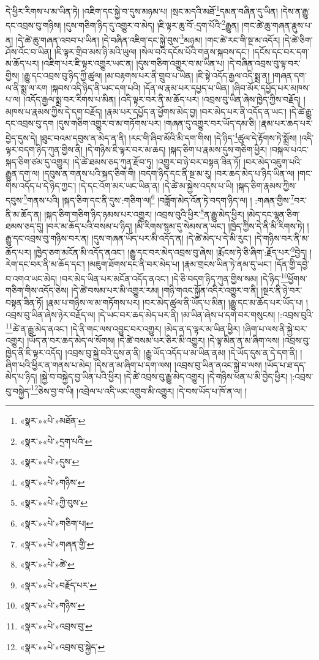 དེ་ཕྱིར་རིགས་པ་མ་ཡིན་ཏེ། །འཇིག་དང་སྐྱེ་བ་དུས་མཉམ་པ། །སྲང་མདའི་མཐོ་\footnote{«སྣར་»«པེ་»མཐོན་}དམན་བཞིན་དུ་ཡིན། །དེས་ན་རྒྱུ་དང་འབྲས་བུ་གཉིས། །དུས་གཅིག་ཉིད་དུ་འགྱུར་བ་མེད། །ཇི་ལྟར་ཆུ་བོ་:དྲག་པོའི་\footnote{«སྣར་»«པེ་»དྲག་པའི་}རྒྱུན། །གང་ཚེ་ཆུ་གཞན་རྣུས་པ་ན། །དེ་ཚེ་ཆུ་གཞན་འབབ་པ་ཡིན། །དེ་བཞིན་འཇིག་དང་སྐྱེ་བུས་\footnote{«སྣར་»«པེ་»དུས་}མཉམ། །གང་ཚེ་རང་གི་སྔ་མ་འདོར། །དེ་ཚེ་ཅིག་ཤོས་འོང་བ་ཡིན། །ཇི་ལྟར་གྲིབ་མས་ཉི་མའི་ཡུལ། །སེལ་བའི་དངོས་པོའི་གནས་སྐབས་དང་། །དངོས་དང་བར་དག་མ་ཆོད་པར། །འཇིག་པར་ཇི་ལྟར་འགྱུར་ཡང་ན། །དུས་གཅིག་འགྱུར་བ་མ་ཡིན་པ། །དེ་བཞིན་འབྲས་བུ་ལྟ་བར་གྱིས། །རྒྱུ་དང་འབྲས་བུ་ཉིད་ཀྱི་ཚུལ། །མ་བརྟགས་པར་ནི་གྲུབ་པ་ཡིན། །ཇི་སྟེ་འདོད་རྒྱལ་འདི་སྨྲ་ན། །གཞན་དག་ལ་ནི་སྨྲ་ལ་རག །སྐབས་འདི་ཉིད་ནི་ཡང་དག་པའི། །དོན་ལ་རྣམ་པར་དཔྱད་པ་ཡིན། །ཞིབ་མོར་དཔྱོད་པར་མཁས་པ་ལ། །འདོད་རྒྱལ་སྨྲ་བར་རིགས་པ་མིན། །འདི་ལྟར་བར་ནི་མ་ཆོད་པར། །འབྲས་བུ་ཡིན་ཞེས་ཁྱེད་ཀྱིས་བརྗོད། །མཁས་པ་རྣམས་ཀྱིས་དེ་དག་བརྗོད། །རྣམ་པར་དཔྱོད་ན་ཕྱོགས་མེད་བྱ། །བར་མེད་པར་ནི་འདོད་ན་ཡང་། །དེ་ཚེ་རྒྱུ་དང་འབྲས་བུ་དག །དུས་གཅིག་འགྱུར་བ་མ་གཏོགས་པར། །གཞན་དུ་འགྱུར་བར་ཡོད་དམ་ཅི། །རྣམ་པར་ཆད་པར་བྱེད་དུས་དེ། །ཐུང་བའམ་དབུས་ན་མེད་ན་ནི། །རང་གི་ཞིབ་མོའི་མི་དག་གིས། །དེ་ཉིད་\footnote{«སྣར་»«པེ་»གཉིས་}ཚུལ་དེ་རྟོགས་ཏེ་སྨྲོས། །འདི་ལྟར་བདག་ཉིད་ཀུན་གྱིས་ནི། །དེ་གཉིས་ཇི་ལྟར་བར་མ་ཆད། །སྐད་ཅིག་པ་རྣམས་དུས་གཅིག་ཕྱིར། །བསྐལ་པའང་སྐད་ཅིག་ཙམ་དུ་འགྱུར། །དེ་ཚེ་ཐམས་ཅད་ཀུན་རྫོབ་ཏུ། །འགྱུར་བ་ཉེ་བར་བསྟན་ཟིན་ཏོ། །བར་མེད་འཇུག་པའི་རྒྱུན་དག་ལ། །དབུས་ན་གནས་པའི་སྐད་ཅིག་གི། །བདག་ཉིད་དང་ནི་སྔ་མ་རུ། །བར་ཆད་མེད་པ་ཉིད་ཡིན་ལ། །གང་གིས་འདོད་པ་དེ་ཉིད་ཀྱང་། །དེ་དང་འོག་མར་ཡང་ཡིན་ན། །དེ་ཚེ་མ་སྐྱེས་འདས་པ་ཡི། །སྐད་ཅིག་རྣམས་ཀྱིས་དབུས་\footnote{«སྣར་»«པེ་»ཀྱི་བུས་}གནས་པའི། །སྐད་ཅིག་དང་ནི་དུས་:གཅིག་ལ།\footnote{«སྣར་»«པེ་»གཅིག་པ།} །བཟློག་མེད་འོན་ཏེ་བདག་ཉིད་ལ། །
:གཞན་གྱིས་\footnote{«སྣར་»«པེ་»གཞན་གྱི་}བར་ནི་མ་ཆོད་ན། །སྐད་ཅིག་གཅིག་ཉིད་ཉམས་པར་འགྱུར། །འབྲས་བུའི་ཕྱིར་\footnote{«སྣར་»«པེ་»ཚེ་}ན་རྒྱུ་མེད་ཕྱིར། །མེད་དང་ལྷན་ཅིག་ཐམས་ཅད་དུ། །བར་མ་ཆོད་པའི་བསམ་པ་ཉིད། །མི་རིགས་སྙམ་དུ་སེམས་ན་ཡང་། །ཁྱེད་ཀྱིས་དེ་ནི་མི་རིགས་ཏེ། །རྒྱུ་དང་འབྲས་བུ་གཉིས་བར་ན། །དུས་གཞན་ཡོད་པར་མི་འདོད་ན། །དེ་ཚེ་མེད་པ་དེ་མི་རུང་། །དེ་གཉིས་བར་ནི་མ་ཆོད་པར། །ཁྱེད་ཅག་མངོན་མི་འདོད་ནའང་། །རྒྱུ་དང་བར་མེད་འབྲས་བུ་ཞེས། །རྨོངས་ཏེ་ཅི་ཞིག་:རྗོད་པར་\footnote{«སྣར་»«པེ་»བརྗོད་པར་}བྱེད། །རེག་དང་བར་ནི་མ་ཆོད་དང་། །མཇུག་ཐོགས་དང་ནི་བར་མེད་པ། །རྣམ་གྲངས་ཡིན་ཏེ་ནམ་དུ་ཡང་། །དོན་གྱི་དབྱེ་བ་འགའ་ཡང་མེད། །བར་མེད་ཡིན་པར་མངོན་འདོད་ནའང་། །དེ་ཅི་བདག་ཉིད་ཀུན་གྱིས་སམ། །དེ་ཉིད་\footnote{«སྣར་»«པེ་»གཉིས་}ཕྱོགས་གཅིག་གིས་འདོད་ཅེས། །དེ་ཚེ་བསམ་པར་མི་འགྱུར་རམ། །གཉི་གའང་སྐྱོན་འདིར་འགྱུར་བ་ནི། །སྔར་ནི་ཉེ་བར་བསྟན་ཟིན་ཏོ། །རྣམ་པ་གཉིས་ལ་མ་གཏོགས་པར། །བར་མེད་ཚུལ་ནི་ཡོད་པ་མིན། །རྒྱུ་དང་མ་ཆོད་པར་ཡོད་པ། །འབྲས་བུ་ཡིན་ཞེས་ཉེར་བརྗོད་ལ། །དེ་ཡང་བར་ཆད་མེད་པར་ནི། །མ་ཡིན་ཞེས་པ་དགེ་བར་གསུངས། །:འབྲས་བུའི་\footnote{«སྣར་»«པེ་»འབྲས་བུ་}ཚེ་ན་རྒྱུ་མེད་ནའང་། །དེ་ནི་གང་ལས་འབྱུང་བར་འགྱུར། །མེད་ན་ད་ལྟར་མ་ཡིན་ཕྱིར། །ཞིག་པ་ལས་ནི་སྐྱེ་བར་འགྱུར། །ཡོད་ན་བར་ཆད་མེད་ལ་སོགས། །དེ་ཚེ་བསམ་པར་ཅིར་མི་འགྱུར། །དེ་ལྟ་མིན་ན་མ་ཞིག་ལས། །འབྲས་བུ་ཁྱེད་ནི་ཇི་ལྟར་འདོད། །འབྲས་བུ་སྐྱེ་བའི་དུས་ན་ནི། །རྒྱུ་ཡོད་འདོད་པ་མ་ཡིན་ནམ། །དེ་ཡོད་དུས་ན་དེ་དག་ནི། །ཞིག་པའི་ཕྱིར་ན་གནས་པ་མེད། །དེས་ན་མ་ཞིག་པ་དག་ལས། །འབྲས་བུ་ཡིན་ནའང་སྐྱེ་བ་ལས། །ཡོད་པ་ཐ་དད་མེད་པ་ཉིད། །སྐྱེ་བ་བསྐྱེད་བྱ་ཡིན་པའི་ཕྱིར། །དེ་ཚེ་འབྲས་བུ་རྒྱུ་མེད་འགྱུར། །དེ་གཉིས་ཕན་པ་མི་བྱེད་ཕྱིར། །:འབྲས་བུ་བསྐྱེད་\footnote{«སྣར་»«པེ་»འབྲས་བུ་སྐྱེད་}ཅེས་བྱ་བ་ཡི། །འབྲེལ་པ་འདི་ཡང་འགྲུབ་མི་འགྱུར། །དེ་བས་ཡོད་པ་ཁོ་ན་ལ། །
